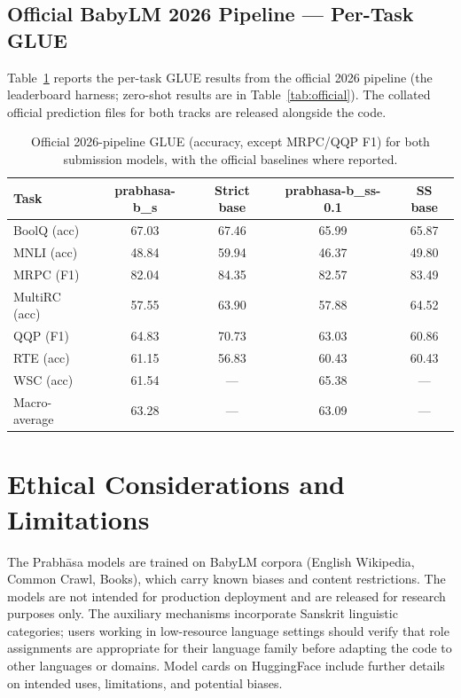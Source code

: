 \subsection{Official BabyLM 2026 Pipeline — Per-Task GLUE}

Table~\ref{tab:official_glue} reports the per-task GLUE results from the official 2026 pipeline (the leaderboard harness; zero-shot results are in Table~\ref{tab:official}). The collated official prediction files for both tracks are released alongside the code.

\begin{table}[h]
\centering
\small
\caption{Official 2026-pipeline GLUE (accuracy, except MRPC/QQP F1) for both submission models, with the official baselines where reported.}
\label{tab:official_glue}
\begin{tabular}{lcccc}
\toprule
Task & prabhasa-b\_s & Strict base & prabhasa-b\_ss-0.1 & SS base \\
\midrule
BoolQ (acc) & 67.03 & 67.46 & 65.99 & 65.87 \\
MNLI (acc) & 48.84 & 59.94 & 46.37 & 49.80 \\
MRPC (F1) & 82.04 & 84.35 & 82.57 & 83.49 \\
MultiRC (acc) & 57.55 & 63.90 & 57.88 & 64.52 \\
QQP (F1) & 64.83 & 70.73 & 63.03 & 60.86 \\
RTE (acc) & 61.15 & 56.83 & 60.43 & 60.43 \\
WSC (acc) & 61.54 & — & 65.38 & — \\
\midrule
Macro-average & 63.28 & — & 63.09 & — \\
\bottomrule
\end{tabular}
\end{table}

\section{Ethical Considerations and Limitations}

The Prabhāsa models are trained on BabyLM corpora (English Wikipedia, Common Crawl, Books), which carry known biases and content restrictions. The models are not intended for production deployment and are released for research purposes only. The auxiliary mechanisms incorporate Sanskrit linguistic categories; users working in low-resource language settings should verify that role assignments are appropriate for their language family before adapting the code to other languages or domains. Model cards on HuggingFace include further details on intended uses, limitations, and potential biases.
